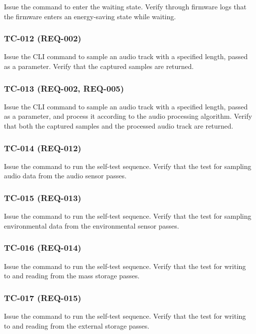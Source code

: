 \documentclass[11pt,a4paper]{article}
\begin{document}
Issue the command to enter the waiting state. Verify through firmware logs that
the firmware enters an energy-saving state while waiting.

\subsubsection{TC-012 (REQ-002)}

Issue the CLI command to sample an audio track with a specified length, passed
as a parameter. Verify that the captured samples are returned.

\subsubsection{TC-013 (REQ-002, REQ-005)}

Issue the CLI command to sample an audio track with a specified length, passed
as a parameter, and process it according to the audio processing algorithm.
Verify that both the captured samples and the processed audio track are
returned.

\subsubsection{TC-014 (REQ-012)}

Issue the command to run the self-test sequence. Verify that the test for
sampling audio data from the audio sensor passes.

\subsubsection{TC-015 (REQ-013)}

Issue the command to run the self-test sequence. Verify that the test for
sampling environmental data from the environmental sensor passes.

\subsubsection{TC-016 (REQ-014)}

Issue the command to run the self-test sequence. Verify that the test for
writing to and reading from the mass storage passes.

\subsubsection{TC-017 (REQ-015)}

Issue the command to run the self-test sequence. Verify that the test for
writing to and reading from the external storage passes.
\end{document}
